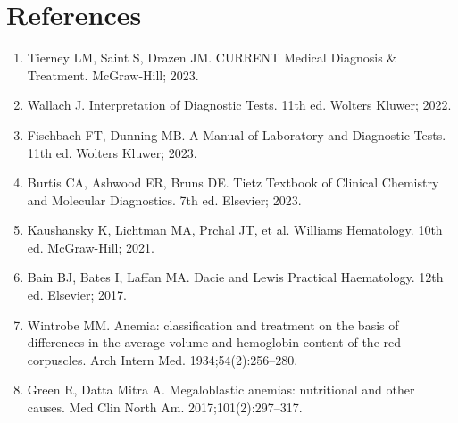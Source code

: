 \section*{References}
\begin{enumerate}
  \item Tierney LM, Saint S, Drazen JM. CURRENT Medical Diagnosis \& Treatment. McGraw-Hill; 2023.
  \item Wallach J. Interpretation of Diagnostic Tests. 11th ed. Wolters Kluwer; 2022.
  \item Fischbach FT, Dunning MB. A Manual of Laboratory and Diagnostic Tests. 11th ed. Wolters Kluwer; 2023.
  \item Burtis CA, Ashwood ER, Bruns DE. Tietz Textbook of Clinical Chemistry and Molecular Diagnostics. 7th ed. Elsevier; 2023.
  \item Kaushansky K, Lichtman MA, Prchal JT, et al. Williams Hematology. 10th ed. McGraw-Hill; 2021.
  \item Bain BJ, Bates I, Laffan MA. Dacie and Lewis Practical Haematology. 12th ed. Elsevier; 2017.
  \item Wintrobe MM. Anemia: classification and treatment on the basis of differences in the average volume and hemoglobin content of the red corpuscles. Arch Intern Med. 1934;54(2):256--280.
  \item Green R, Datta Mitra A. Megaloblastic anemias: nutritional and other causes. Med Clin North Am. 2017;101(2):297--317.
\end{enumerate}

\clearpage
